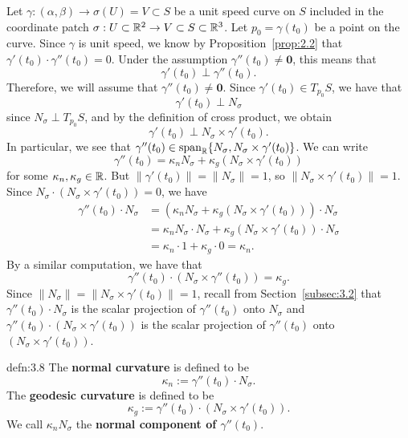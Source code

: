 Let $\gamma : (\alpha, \beta) \to \sigma(U) = V \subset S$ be a unit speed 
curve on $S$ included in the coordinate patch $\sigma : U \subset \mathbb{R}^2 
\to V \subset S \subset \mathbb{R}^3$. Let $p_0 = \gamma(t_0)$ be a point on the 
curve. Since $\gamma$ is unit speed, we know by Proposition~\ref{prop:2.2} 
that $\gamma'(t_0) \cdot \gamma''(t_0) = 0$. Under the assumption 
$\gamma''(t_0) \neq \mathbf 0$, this means that 
\[ \gamma'(t_0) \perp \gamma''(t_0). \]
Therefore, we will assume that $\gamma''(t_0) \neq \mathbf 0$. 
Since $\gamma'(t_0) \in T_{p_0}S$, we have that 
\[ \gamma'(t_0) \perp N_\sigma \] 
since $N_\sigma \perp T_{p_0}S$, and by the definition of cross product, we obtain 
\[ \gamma'(t_0) \perp N_\sigma \times \gamma'(t_0). \] 
In particular, we see that $\gamma''(t_0) \in \operatorname{span}_{\mathbb{R}}\{N_\sigma, N_\sigma 
\times \gamma'(t_0)\}$. We can write 
\[ \gamma''(t_0) = \kappa_n N_\sigma + \kappa_g (N_\sigma \times \gamma'(t_0)) \] 
for some $\kappa_n, \kappa_g \in \mathbb{R}$. But $\|\gamma'(t_0)\| = \|N_\sigma\| = 1$,
so $\|N_\sigma \times \gamma'(t_0)\| = 1$. Since 
$N_\sigma \cdot (N_\sigma \times \gamma'(t_0)) = 0$,
we have 
\begin{align*}
    \gamma''(t_0) \cdot N_\sigma 
    &= (\kappa_n N_\sigma + \kappa_g (N_\sigma \times \gamma'(t_0))) \cdot N_\sigma \\ 
    &= \kappa_n N_\sigma \cdot N_\sigma + \kappa_g (N_\sigma \times \gamma'(t_0)) \cdot N_\sigma \\ 
    &= \kappa_n \cdot 1 + \kappa_g \cdot 0 = \kappa_n. 
\end{align*}
By a similar computation, we have that 
\[ \gamma''(t_0) \cdot (N_\sigma \times \gamma''(t_0)) = \kappa_g. \] 
Since $\|N_\sigma\| = \|N_\sigma \times \gamma'(t_0)\| = 1$, recall from 
Section~\ref{subsec:3.2} that $\gamma''(t_0) \cdot N_\sigma$ is the scalar 
projection of $\gamma''(t_0)$ onto $N_\sigma$ and $\gamma''(t_0) \cdot 
(N_\sigma \times \gamma'(t_0))$ is the scalar projection of $\gamma''(t_0)$ 
onto $(N_\sigma \times \gamma'(t_0))$. 

\begin{defn}{defn:3.8}
    The {\bf normal curvature} is defined to be 
    \[ \kappa_n := \gamma''(t_0) \cdot N_\sigma. \] 
    The {\bf geodesic curvature} is defined to be 
    \[ \kappa_g := \gamma''(t_0) \cdot (N_\sigma \times \gamma'(t_0)). \] 
    We call $\kappa_n N_\sigma$ the {\bf normal component of $\gamma''(t_0)$}.
\end{defn}\vspace{-0.25cm}

